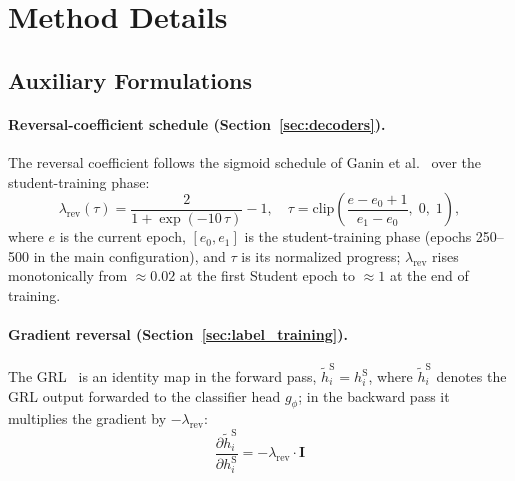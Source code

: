 
\section{Method Details}
\label{sec:appendix_method}

\subsection{Auxiliary Formulations}
\label{sec:aux_formulations}

\paragraph{Reversal-coefficient schedule (Section~\ref{sec:decoders}).}
The reversal coefficient follows the sigmoid schedule of Ganin et al.~\cite{ganin2016dann} over the
student-training phase:
\begin{equation}
  \lambda_{\mathrm{rev}}(\tau) = \frac{2}{1 + \exp(-10\,\tau)} - 1,
  \quad \tau = \mathrm{clip}\!\left(\frac{e - e_0 + 1}{e_1 - e_0},\; 0,\; 1\right),
  \label{eq:rev_schedule}
\end{equation}
where $e$ is the current epoch, $[e_0, e_1]$ is the student-training phase (epochs 250--500 in
the main configuration), and $\tau$ is its normalized progress; $\lambda_{\mathrm{rev}}$ rises
monotonically from ${\approx}0.02$ at the first Student epoch to ${\approx}1$ at the end of
training.

\paragraph{Gradient reversal (Section~\ref{sec:label_training}).}
The GRL~\cite{ganin2016dann} is an identity map in the forward pass,
$\tilde{h}^{\mathrm{S}}_i = h^{\mathrm{S}}_i$, where $\tilde{h}^{\mathrm{S}}_i$ denotes the
GRL output forwarded to the classifier head $g_\phi$; in the backward pass it multiplies the
gradient by $-\lambda_{\mathrm{rev}}$:
\begin{equation}
  \frac{\partial \tilde{h}^{\mathrm{S}}_i}{\partial h^{\mathrm{S}}_i}
    = -\lambda_{\mathrm{rev}} \cdot \mathbf{I}
  \label{eq:grl}
\end{equation}

